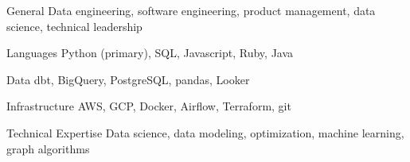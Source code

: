 

\begin{cvskills}
  \cvskill
    {General}
    {Data engineering, software engineering, product management, data science, technical leadership}

  \cvskill
    {Languages}
    {Python (primary), SQL, Javascript, Ruby, Java}

  \cvskill
    {Data}
    {dbt, BigQuery, PostgreSQL, pandas, Looker}

  \cvskill
    {Infrastructure}
    {AWS, GCP, Docker, Airflow, Terraform, git}

  \cvskill
    {Technical Expertise}
    {Data science, data modeling, optimization, machine learning, graph algorithms}
\end{cvskills}
